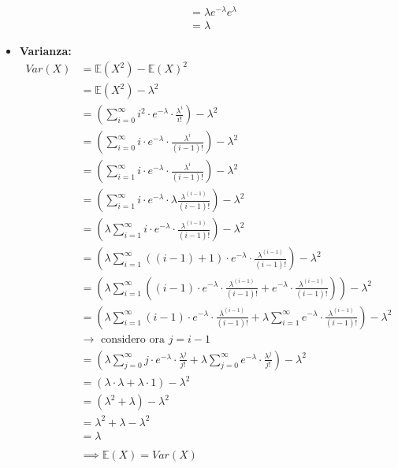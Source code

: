 \documentclass[11pt]{report}
\begin{document}
\begin{itemize}
\begin{equation}
\begin{split}
            & = \lambda e^{-\lambda} e^\lambda\\
            & = \lambda
		\end{split}
    \end{equation}
    \item \textbf{Varianza:}
    \begin{equation}
    	\begin{split}
   			Var(X) & = \mathbb{E}(X^2) - \mathbb{E}(X)^2\\
   			& = \mathbb{E}(X^2) - \lambda^2\\
            & = \left( \sum_{i=0}^\infty i^2 \cdot e^{-\lambda} \cdot \frac{\lambda^i}{i!} \right) - \lambda^2\\
            & = \left( \sum_{i=0}^\infty i \cdot e^{-\lambda} \cdot \frac{\lambda^i}{(i-1)!} \right) - \lambda^2\\
            & = \left( \sum_{i=1}^\infty i \cdot e^{-\lambda} \cdot \frac{\lambda^i}{(i-1)!} \right) - \lambda^2\\
            & = \left( \sum_{i=1}^\infty i \cdot e^{-\lambda} \cdot \lambda \frac{\lambda^{(i-1)}}{(i-1)!} \right) - \lambda^2\\
            & = \left( \lambda \sum_{i=1}^\infty i \cdot e^{-\lambda} \cdot \frac{\lambda^{(i-1)}}{(i-1)!} \right) - \lambda^2\\
            & = \left( \lambda \sum_{i=1}^\infty ((i-1)+1) \cdot e^{-\lambda} \cdot \frac{\lambda^{(i-1)}}{(i-1)!} \right) - \lambda^2\\
            & = \left( \lambda \sum_{i=1}^\infty \left( (i-1) \cdot e^{-\lambda} \cdot \frac{\lambda^{(i-1)}}{(i-1)!} + e^{-\lambda} \cdot \frac{\lambda^{(i-1)}}{(i-1)!} \right) \right) - \lambda^2\\
            & = \left( \lambda \sum_{i=1}^\infty (i-1) \cdot e^{-\lambda} \cdot \frac{\lambda^{(i-1)}}{(i-1)!} + \lambda \sum_{i=1}^\infty e^{-\lambda} \cdot \frac{\lambda^{(i-1)}}{(i-1)!} \right) - \lambda^2\\
            & \rightarrow \text{ considero ora } j = i-1\\
            & = \left( \lambda \sum_{j=0}^\infty j \cdot e^{-\lambda} \cdot \frac{\lambda^j}{j!} + \lambda \sum_{j=0}^\infty e^{-\lambda} \cdot \frac{\lambda^j}{j!} \right) - \lambda^2\\
            & = \left( \lambda \cdot \lambda + \lambda \cdot 1 \right) - \lambda^2\\
            & = \left( \lambda^2 + \lambda \right) - \lambda^2\\
            & = \lambda^2 + \lambda - \lambda^2\\
            & = \lambda\\
            &\\
            & \implies \mathbb{E}(X) = Var(X)
		\end{split}
    \end{equation}
\end{itemize}
\end{document}
